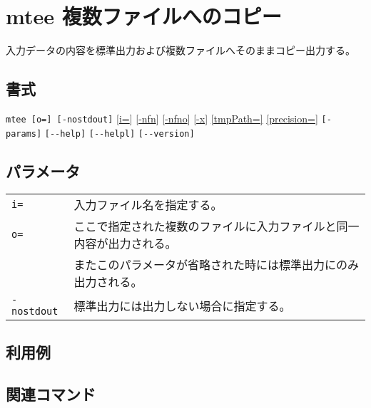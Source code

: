 
%

\section{mtee 複数ファイルへのコピー\label{sect:mtee}}
入力データの内容を標準出力および複数ファイルへそのままコピー出力する。

\subsection*{書式}
\verb|mtee [o=] [-nostdout]|
[\hyperref[sect:option_i]{i=}] 
[\hyperref[sect:option_nfn]{-nfn}] 
[\hyperref[sect:option_nfno]{-nfno}]  
[\hyperref[sect:option_x]{-x}] 
\hyperref[sect:option_option_tmppath]{[tmpPath=]}
\hyperref[sect:option_precision]{[precision=]}
\verb|[-params]|
\verb|[--help]|
\verb|[--helpl]|
\verb|[--version]|\\

\subsection*{パラメータ}
\begin{table}[htbp]
{\small
\begin{tabular}{ll}
\verb|i=|        & 入力ファイル名を指定する。\\
\verb|o=|        & ここで指定された複数のファイルに入力ファイルと同一内容が出力される。\\
                 & またこのパラメータが省略された時には標準出力にのみ出力される。\\
\verb|-nostdout| & 標準出力には出力しない場合に指定する。\\
\end{tabular} 
}
\end{table} 

\subsection*{利用例}


\subsection*{関連コマンド}

%
